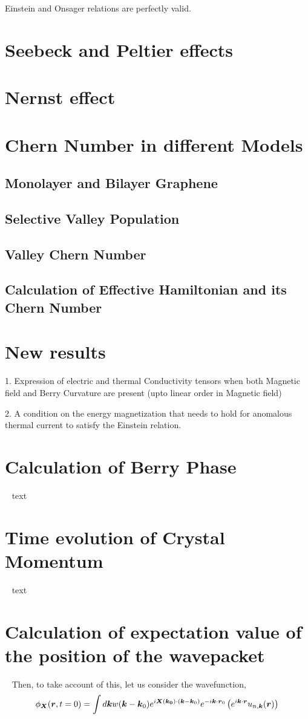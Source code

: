 \documentclass{revtex4-2}
\renewcommand\vec[1]{\ensuremath\boldsymbol{#1}} %
\begin{document}
Einstein and Onsager relations are perfectly valid.


\section{Seebeck and Peltier effects}
\section{Nernst effect}
\section{Chern Number in different Models}
\subsection{Monolayer and Bilayer Graphene}
\subsection{Selective Valley Population}
\subsection{Valley Chern Number}
\subsection{Calculation of Effective Hamiltonian and its Chern Number}

\section{New results}
1. Expression of electric and thermal Conductivity tensors when both Magnetic field and Berry Curvature are present (upto linear order in Magnetic field)

2. A condition on the energy magnetization that needs to hold for anomalous thermal current to satisfy the Einstein relation.
\appendix
\section{Calculation of Berry Phase}~\label{app:BerryPhase}
text
\section{Time evolution of Crystal Momentum}~\label{app:crystal-momentum-time-evolution}
text
\section{Calculation of expectation value of the position of the wavepacket}~\label{app:center-at-zero-time}
Then, to take account of this, let us consider the wavefunction, $$\phi_{\vec{X}}(\vec{r}, t=0) = \int d\vec{k} w(\vec{k} - \vec{k}_0) e^{i \vec{X}(\vec{k_0})\cdot (\vec{k} - \vec{k}_0)} e^{-i \vec{k} \cdot \vec{r}_0 } \left(e^{i \vec{k} \cdot\vec{r}} u_{n,\vec{k}}(\vec{r})\right)$$
\end{document}
